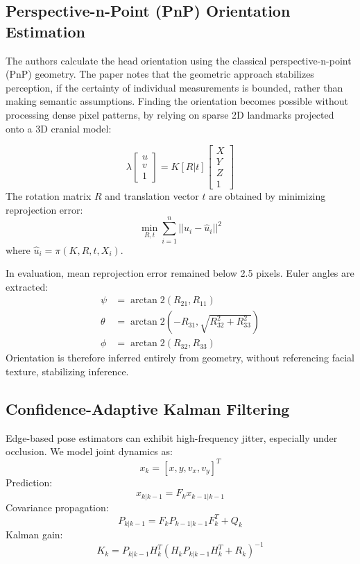 \documentclass[conference]{IEEEtran}
\begin{document}
\subsection{Perspective-n-Point (PnP) Orientation Estimation}
The authors calculate the head orientation using the classical perspective-n-point (PnP) geometry. The paper notes that the geometric approach stabilizes perception, if the certainty of individual measurements is bounded, rather than making semantic assumptions. Finding the orientation becomes possible without processing dense pixel patterns, by relying on sparse 2D landmarks projected onto a 3D cranial model:

\begin{equation}
\lambda \begin{bmatrix} u \\ v \\ 1 \end{bmatrix} = K [R | t] \begin{bmatrix} X \\ Y \\ Z \\ 1 \end{bmatrix}
\end{equation}
The rotation matrix $R$ and translation vector $t$ are obtained by minimizing reprojection error:
\begin{equation}
\min_{R, t} \sum_{i=1}^{n} || u_i - \hat{u}_i ||^2
\end{equation}
where $\hat{u}_i = \pi(K, R, t, X_i)$.

In evaluation, mean reprojection error remained below 2.5 pixels. Euler angles are extracted:
\begin{align}
\psi &= \arctan2(R_{21}, R_{11}) \\
\theta &= \arctan2(-R_{31}, \sqrt{R_{32}^2 + R_{33}^2}) \\
\phi &= \arctan2(R_{32}, R_{33})
\end{align}
Orientation is therefore inferred entirely from geometry, without referencing facial texture, stabilizing inference.

\subsection{Confidence-Adaptive Kalman Filtering}
Edge-based pose estimators can exhibit high-frequency jitter, especially under occlusion. We model joint dynamics as:
\begin{equation}
x_k = [x, y, v_x, v_y]^T
\end{equation}
Prediction:
\begin{equation}
x_{k|k-1} = F_k x_{k-1|k-1}
\end{equation}
Covariance propagation:
\begin{equation}
P_{k|k-1} = F_k P_{k-1|k-1} F_k^T + Q_k
\end{equation}
Kalman gain:
\begin{equation}
K_k = P_{k|k-1} H_k^T (H_k P_{k|k-1} H_k^T + R_k)^{-1}
\end{equation}
\end{document}
